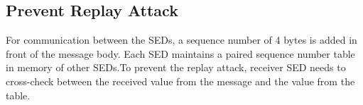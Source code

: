 \documentclass[11pt,oneside,onecolumn,letterpaper]{article}
\begin{document}



  \subsection{Prevent Replay Attack}
  For communication between the SEDs, a sequence number of 4 bytes is added in front of the message body. Each SED maintains a paired sequence number table in memory of other SEDs.To prevent the replay attack, receiver SED needs to cross-check between the received value from the message and the value from the table.
 
\end{document}
